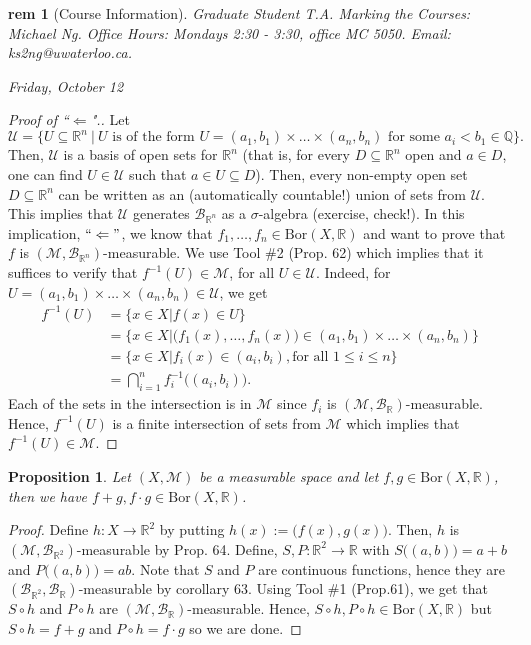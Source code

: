 \documentclass[letterpaper, 12pt]{article}
\newcommand{\fin}{\qquad \quad \hfill \framebox[1.75mm][l]{\,}}
\newcommand{\cU}{\mathcal{U}}
\newcommand{\cB}{\mathcal{B}}
\newcommand{\cM}{\mathcal{M}}
\newcommand{\bR}{\mathbb{R}}
\newcommand{\bQ}{\mathbb{Q}}
\theoremstyle{stdthm}
\newtheorem{prop}[thm]{Proposition}
\theoremstyle{stddef}
\newtheorem{rem}[thm]{rem} %
\theoremstyle{stdnonum}
\theoremstyle{stdqands}
\theoremstyle{stdbold}
\begin{document}
\begin{rem} [Course Information] 
Graduate Student T.A. Marking the Courses: Michael Ng. Office Hours: Mondays 2:30 - 3:30, office MC 5050. Email: ks2ng@uwaterloo.ca. 
\end{rem}

\begin{center}
\emph{Friday, October 12}
\end{center}
\begin{proof}[Proof of ``$\Leftarrow$".]
Let 
\[
\cU = \{ U \subseteq \bR^n\ |\ U \text{ is of the form } U = (a_1,b_1)\times \dots \times (a_n,b_n) \text{ for some } a_i < b_1 \in \bQ\}.
\] Then, $\cU$ is a basis of open sets for $\bR^n$ (that is, for every $D \subseteq \bR^n$ open and $a \in D$, one can find $U \in \cU$ such that $a \in U \subseteq D$). Then, every non-empty open set $D \subseteq \bR^n$ can be written as an (automatically countable!) union of sets from $\cU$. This implies that $\cU$ generates $\cB_{\bR^n}$ as a $\sigma$-algebra (exercise, check!). In this implication, $``\Leftarrow"$, we know that $f_1,\dots, f_n \in \mathrm{Bor}(X,\bR)$ and want to prove that $f$ is $(\cM,\cB_{\bR^n})$-measurable.  We use Tool \#2 (Prop. 62) which implies that it suffices to verify that $f^{-1}(U) \in \cM$, for all $U \in \cU$. Indeed, for $U = (a_1,b_1) \times \dots \times (a_n, b_n) \in \cU$, we get 
\begin{align*}
f^{-1}(U) &= \{ x \in X| f(x) \in U\} \\
&= \{x \in X| \big(f_1(x),\dots,f_n(x)\big) \in (a_1,b_1) \times \dots \times (a_n, b_n) \}\\
&= \{ x \in X| f_i(x) \in (a_i, b_i), \text{for all }1 \leq i \leq n \}\\
&= \bigcap_{i=1}^n f_i^{-1}\big((a_i,b_i)\big).
\end{align*}
Each of the sets in the intersection is in $\cM$ since $f_i$ is $(\cM,\cB_\bR)$-measurable. Hence, $f^{-1}(U)$ is a finite intersection of sets from $\cM$ which implies that $f^{-1}(U) \in \cM$. 
\end{proof}

\begin{prop}
Let $(X,\cM)$ be a measurable space and let $f,g \in \mathrm{Bor}(X,\bR)$, then we have $f+g, f\cdot g \in \mathrm{Bor}(X,\bR)$.  
\end{prop}

\begin{proof}
Define $h: X \rightarrow \bR^2$ by putting $h(x) := \big(f(x),g(x)\big)$. Then, $h$ is $(\cM,\cB_{\bR^2})$-measurable by Prop. 64. Define, $S,P: \bR^2 \rightarrow \bR$ with $S\big((a,b)\big) = a+b$ and $P\big((a,b)\big) = ab$. Note that $S$ and $P$ are continuous functions, hence they are $(\cB_{\bR^2}, \cB_\bR)$-measurable by corollary 63. Using Tool \#1 (Prop.61), we get that $S\circ h$ and $P\circ h$ are $(\cM,\cB_{\bR})$-measurable. Hence, $S\circ h, P\circ h \in \mathrm{Bor}(X,\bR)$ but $S\circ h = f + g$  and $P\circ h = f\cdot g$ so we are done. 
\end{proof}
\end{document}

